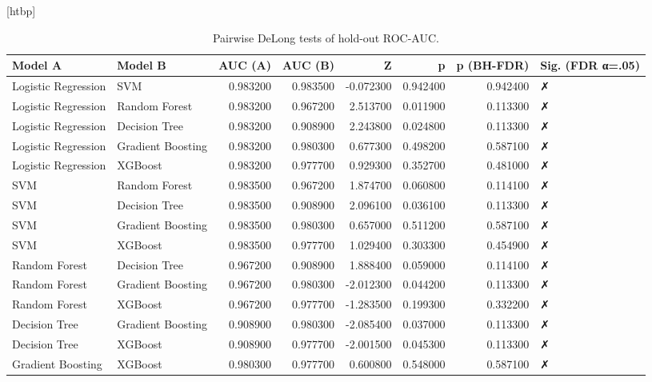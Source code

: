 \begin{table}
\small[htbp]
\caption{Pairwise DeLong tests of hold-out ROC-AUC.}
\label{tab:A03_delong}
\begin{tabular}{llrrrrrl}
\toprule
Model A & Model B & AUC (A) & AUC (B) & Z & p & p (BH-FDR) & Sig. (FDR α=.05) \\
\midrule
Logistic Regression & SVM & 0.983200 & 0.983500 & -0.072300 & 0.942400 & 0.942400 & ✗ \\
Logistic Regression & Random Forest & 0.983200 & 0.967200 & 2.513700 & 0.011900 & 0.113300 & ✗ \\
Logistic Regression & Decision Tree & 0.983200 & 0.908900 & 2.243800 & 0.024800 & 0.113300 & ✗ \\
Logistic Regression & Gradient Boosting & 0.983200 & 0.980300 & 0.677300 & 0.498200 & 0.587100 & ✗ \\
Logistic Regression & XGBoost & 0.983200 & 0.977700 & 0.929300 & 0.352700 & 0.481000 & ✗ \\
SVM & Random Forest & 0.983500 & 0.967200 & 1.874700 & 0.060800 & 0.114100 & ✗ \\
SVM & Decision Tree & 0.983500 & 0.908900 & 2.096100 & 0.036100 & 0.113300 & ✗ \\
SVM & Gradient Boosting & 0.983500 & 0.980300 & 0.657000 & 0.511200 & 0.587100 & ✗ \\
SVM & XGBoost & 0.983500 & 0.977700 & 1.029400 & 0.303300 & 0.454900 & ✗ \\
Random Forest & Decision Tree & 0.967200 & 0.908900 & 1.888400 & 0.059000 & 0.114100 & ✗ \\
Random Forest & Gradient Boosting & 0.967200 & 0.980300 & -2.012300 & 0.044200 & 0.113300 & ✗ \\
Random Forest & XGBoost & 0.967200 & 0.977700 & -1.283500 & 0.199300 & 0.332200 & ✗ \\
Decision Tree & Gradient Boosting & 0.908900 & 0.980300 & -2.085400 & 0.037000 & 0.113300 & ✗ \\
Decision Tree & XGBoost & 0.908900 & 0.977700 & -2.001500 & 0.045300 & 0.113300 & ✗ \\
Gradient Boosting & XGBoost & 0.980300 & 0.977700 & 0.600800 & 0.548000 & 0.587100 & ✗ \\
\bottomrule
\end{tabular}
\end{table}
